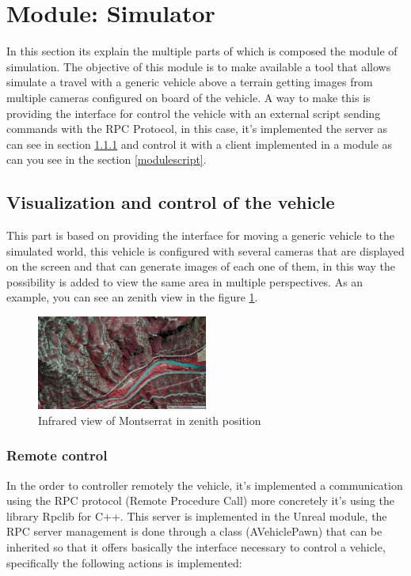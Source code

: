 \documentclass[10pt,a4paper,twocolumn,twoside]{article}
\begin{document}
\newpage
\section{Module: Simulator}

In this section its explain the multiple parts of which is composed the module of simulation. The objective of this module is to make available a tool that allows simulate a travel with a generic vehicle above a terrain getting images from multiple cameras configured on board of the vehicle. A way to make this is providing the interface for control the vehicle with an external script sending commands with the RPC Protocol, in this case, it's implemented the server as can see in section \ref{rpcserver} and control it with a client implemented in a module as can you see in the section \ref{modulescript}.

\subsection{Visualization and control of the vehicle}

This part is based on providing the interface for moving a generic vehicle to the simulated world, this vehicle is configured with several cameras that are displayed on the screen and that can generate images of each one of them, in this way the possibility is added to view the same area in multiple perspectives. As an example, you can see an zenith view in the figure \ref{fig-montserratir}.

\begin{figure}[!h]
\centering
  	\includegraphics[width=0.5\textwidth]{cenitalviewir}
	\caption{Infrared view of Montserrat in zenith position}
	\label{fig-montserratir}
\end{figure}

\subsubsection{Remote control}
\label{rpcserver}

In the order to controller remotely the vehicle, it's implemented a communication using the RPC protocol (Remote Procedure Call) more concretely it's using the library Rpclib\cite{rpclib} for C++. This server is implemented in the Unreal module, the RPC server management is done through a class (AVehiclePawn) that can be inherited so that it offers basically the interface necessary to control a vehicle, specifically the following actions is implemented:
\end{document}
